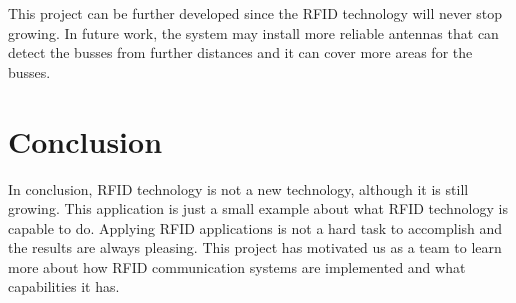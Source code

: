 \documentclass[a4paper,twoside]{IEEEtran}
\begin{document}
This project can be further developed since the RFID technology will never stop growing. In future work, the system may install more reliable antennas that can detect the busses from further distances and it can cover more areas for the busses.

\section{Conclusion}
In conclusion, RFID technology is not a new technology, although it is still growing. This application is just a small example about what RFID technology is capable to do. Applying RFID applications is not a hard task to accomplish and the results are always pleasing. This project has motivated us as a team to learn more about how RFID communication systems are implemented and what capabilities it has.






\end{document}
